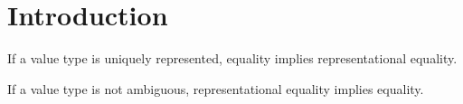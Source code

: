 
\chapter{Introduction}

\begin{lemma}
	If a value type is uniquely represented, equality implies representational equality.
\end{lemma}

\begin{lemma}
	If a value type is not ambiguous, representational equality implies equality.
\end{lemma}
